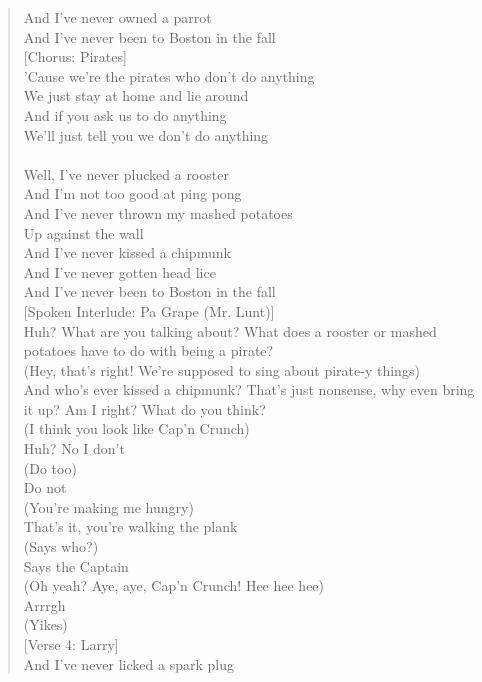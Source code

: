 \documentclass[11pt]{article}
\begin{document}
\begin{verse}
And I've never owned a parrot\\
And I've never been to Boston in the fall\\
\vspace*{1em}
[Chorus: Pirates]\\
'Cause we're the pirates who don't do anything\\
We just stay at home and lie around\\
And if you ask us to do anything\\
We'll just tell you we don't do anything\\
[Verse 3: Larry]\\
Well, I've never plucked a rooster\\
And I'm not too good at ping pong\\
And I've never thrown my mashed potatoes\\
Up against the wall\\
And I've never kissed a chipmunk\\
And I've never gotten head lice\\
And I've never been to Boston in the fall\\
\vspace*{1em}
[Spoken Interlude: Pa Grape (Mr. Lunt)]\\
Huh? What are you talking about? What does a rooster or mashed potatoes have to do with being a pirate?\\
(Hey, that's right! We're supposed to sing about pirate-y things)\\
And who's ever kissed a chipmunk? That's just nonsense, why even bring it up? Am I right? What do you think?\\
(I think you look like Cap'n Crunch)\\
Huh? No I don't\\
(Do too)\\
Do not\\
(You're making me hungry)\\
That's it, you're walking the plank\\
(Says who?)\\
Says the Captain\\
(Oh yeah? Aye, aye, Cap'n Crunch! Hee hee hee)\\
Arrrgh\\
(Yikes)\\
\vspace*{1em}
[Verse 4: Larry]\\
And I've never licked a spark plug\\

\end{verse}
\end{document}
